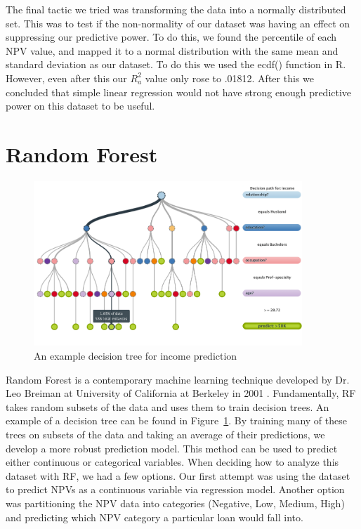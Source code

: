 \documentclass[12 pt]{uncw_thesis}
\theoremstyle{plain}
\theoremstyle{remark}
\theoremstyle{definition}
\begin{document}
The final tactic we tried was transforming the data into a normally distributed set. This was to test if the non-normality of our dataset was having an effect on suppressing our predictive power. To do this, we found the percentile of each NPV value, and mapped it to a normal distribution with the same mean and standard deviation as our dataset. To do this we used the ecdf() function in R. However, even after this our \(R_a^2\) value only rose to .01812. After this we concluded that simple linear regression would not have strong enough predictive power on this dataset to be useful.
\section{Random Forest}
\begin{figure}
	\includegraphics[width=0.9\textwidth]{images/RF.png}
	\caption{An example decision tree for income prediction}
	\label{fig:DecisionTree}
\end{figure}
Random Forest is a contemporary machine learning technique developed by Dr. Leo Breiman at University of California at Berkeley in 2001 \cite{RF}. Fundamentally, RF takes random subsets of the data and uses them to train decision trees. An example of a decision tree can be found in Figure~\ref{fig:DecisionTree}. By training many of these trees on subsets of the data and taking an average of their predictions, we develop a more robust prediction model. This method can be used to predict either continuous or categorical variables. When deciding how to analyze this dataset with RF, we had a few options. Our first attempt was using the dataset to predict NPVs as a continuous variable via regression model. Another option was partitioning the NPV data into categories (Negative, Low, Medium, High) and predicting which NPV category a particular loan would fall into. 
\end{document}
